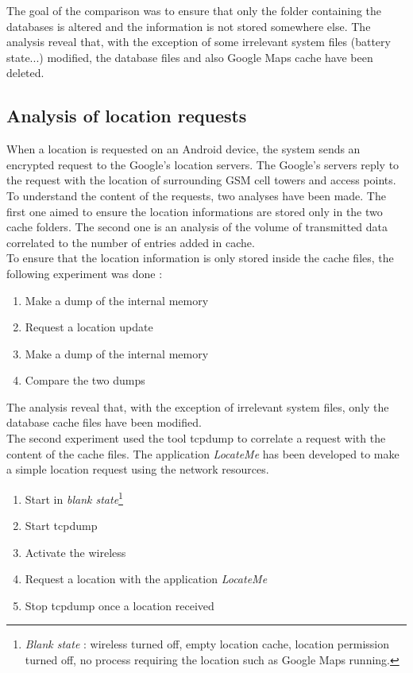 The goal of the comparison was to ensure that only the folder containing the databases is altered and the information is not stored somewhere else.
The analysis reveal that, with the exception of some irrelevant system files (battery state...) modified, the database files and also Google Maps cache have been deleted.\\

\subsection{Analysis of location requests}

When a location is requested on an Android device, the system sends an encrypted request to the Google's location servers.
The Google's servers reply to the request with the location of surrounding GSM cell towers and access points.\\

To understand the content of the requests, two analyses have been made.
The first one aimed to ensure the location informations are stored only in the two cache folders.
The second one is an analysis of the volume of transmitted data correlated to the number of entries added in cache.\\

To ensure that the location information is only stored inside the cache files, the following experiment was done :
\begin{enumerate}
\item Make a dump of the internal memory
\item Request a location update
\item Make a dump of the internal memory
\item Compare the two dumps
\end{enumerate}

The analysis reveal that, with the exception of irrelevant system files, only the database cache files have been modified.\\

The second experiment used the tool tcpdump to correlate a request with the content of the cache files.
The application \emph{LocateMe} has been developed to make a simple location request using the network resources.

\begin{enumerate}
\item Start in \emph{blank state}\footnote{\emph{Blank state} : wireless turned off, empty location cache, location permission turned off, no process requiring the location such as Google Maps running.}
\item Start tcpdump
\item Activate the wireless
\item Request a location with the application \emph{LocateMe}
\item Stop tcpdump once a location received
\end{enumerate}


